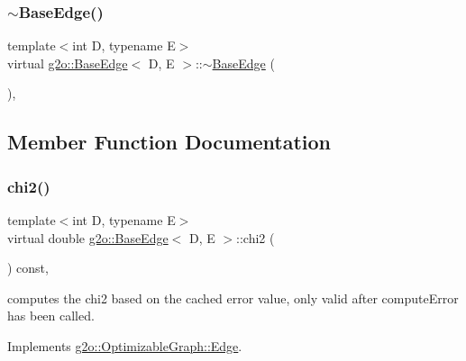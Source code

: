 \mbox{\label{classg2o_1_1_base_edge_a92a5cba950b867f9ff10b8154291087c}} 
\subsubsection{\texorpdfstring{$\sim$\+Base\+Edge()}{~BaseEdge()}}
{\footnotesize\ttfamily template$<$int D, typename E$>$ \\
virtual \mbox{\hyperlink{classg2o_1_1_base_edge}{g2o\+::\+Base\+Edge}}$<$ D, E $>$\+::$\sim$\mbox{\hyperlink{classg2o_1_1_base_edge}{Base\+Edge}} (\begin{DoxyParamCaption}{ }\end{DoxyParamCaption})\hspace{0.3cm}{\ttfamily [inline]}, {\ttfamily [virtual]}}



\subsection{Member Function Documentation}
\mbox{\label{classg2o_1_1_base_edge_a8316137ded4396a2dbf7529d83888400}} 
\subsubsection{\texorpdfstring{chi2()}{chi2()}}
{\footnotesize\ttfamily template$<$int D, typename E$>$ \\
virtual double \mbox{\hyperlink{classg2o_1_1_base_edge}{g2o\+::\+Base\+Edge}}$<$ D, E $>$\+::chi2 (\begin{DoxyParamCaption}{ }\end{DoxyParamCaption}) const\hspace{0.3cm}{\ttfamily [inline]}, {\ttfamily [virtual]}}



computes the chi2 based on the cached error value, only valid after compute\+Error has been called. 



Implements \mbox{\hyperlink{classg2o_1_1_optimizable_graph_1_1_edge_a182bd2c109d50283c638d9b295f2f3d7}{g2o\+::\+Optimizable\+Graph\+::\+Edge}}.


